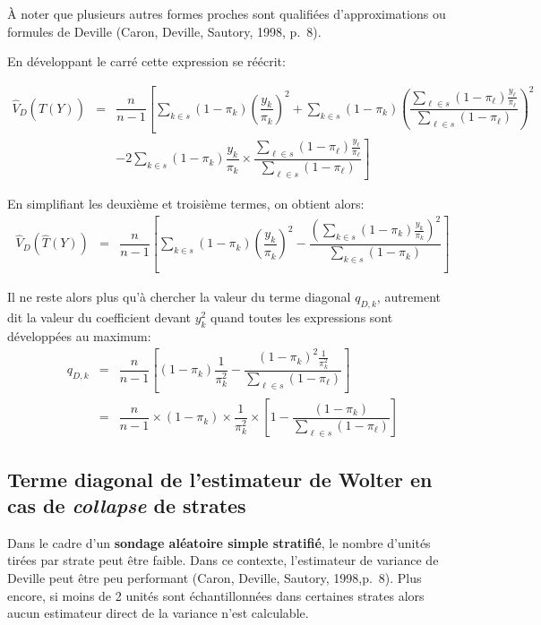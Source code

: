 \documentclass[a4paper,12pt]{article}
\begin{document}
À noter que plusieurs autres formes proches sont qualifiées d'approximations ou formules de Deville (Caron, Deville, Sautory, 1998, p.~8). 

\bigskip En développant le carré cette expression se réécrit:

\begin{eqnarray*}
\hat{V}_D(\hat{T}(Y)) &=& \dfrac{n}{n-1}\left[\sum_{k \in s} ( 1 - \pi_k)\left(\dfrac{y_k}{\pi_k}\right)^2
+ \sum_{k \in s} ( 1 - \pi_k) \left(\dfrac{\sum_{\ell \in s} (1 - \pi_\ell) \frac{y_\ell}{\pi_\ell}}{\sum_{\ell \in s} (1 - \pi_\ell)} \right)^2 \right. \\
&& \left. - 2 \sum_{k \in s} ( 1 - \pi_k) \dfrac{y_k}{\pi_k} \times \dfrac{\sum_{\ell \in s} (1 - \pi_\ell) \frac{y_\ell}{\pi_\ell}}{\sum_{\ell \in s} (1 - \pi_\ell)} \right]
\end{eqnarray*}

En simplifiant les deuxième et troisième termes, on obtient alors:
\begin{eqnarray*}
\hat{V}_D(\hat{T}(Y)) &=& \dfrac{n}{n-1}\left[\sum_{k \in s} ( 1 - \pi_k)\left(\dfrac{y_k}{\pi_k}\right)^2
- \dfrac{\left(\sum_{k \in s} (1 - \pi_k) \frac{y_k}{\pi_k}\right)^2}{\sum_{k \in s} (1 - \pi_k)} \right]
\end{eqnarray*}

Il ne reste alors plus qu'à chercher la valeur du terme diagonal $q_{D,k}$, autrement dit la valeur du coefficient devant $y_k^2$ quand toutes les expressions sont développées au maximum:
\begin{eqnarray*}
q_{D,k} &=& \dfrac{n}{n-1}\left[(1 - \pi_k)\dfrac{1}{\pi_k^2}
- \dfrac{(1 - \pi_k)^2 \frac{1}{\pi_k^2}}{\sum_{\ell \in s} (1 - \pi_\ell)} \right] \\
&=& \dfrac{n}{n-1} \times (1 - \pi_k) \times \dfrac{1}{\pi_k^2} \times \left[1 - \dfrac{(1 - \pi_k)}{\sum_{\ell \in s} (1 - \pi_\ell)} \right]
\end{eqnarray*}

\bigskip \subsection*{Terme diagonal de l'estimateur de Wolter en cas de \textit{collapse} de strates}

Dans le cadre d'un \textbf{sondage aléatoire simple stratifié}, le nombre d'unités tirées par strate peut être faible. Dans ce contexte, l'estimateur de variance de Deville peut être peu performant (Caron, Deville, Sautory, 1998,p.~8). Plus encore, si moins de 2 unités sont échantillonnées dans certaines strates alors aucun estimateur direct de la variance n'est calculable. 
\end{document}
